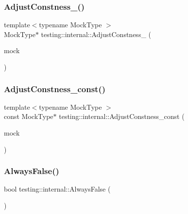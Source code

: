 \subsubsection{\texorpdfstring{AdjustConstness\_()}{AdjustConstness\_()}}
{\footnotesize\ttfamily template$<$typename Mock\+Type $>$ \\
Mock\+Type$\ast$ testing\+::internal\+::\+Adjust\+Constness\+\_\+ (\begin{DoxyParamCaption}\item[{const Mock\+Type $\ast$}]{mock }\end{DoxyParamCaption})}

\mbox{\label{namespacetesting_1_1internal_a018d17632278ac8fc2c9dcaaf629b62d}} 
\subsubsection{\texorpdfstring{AdjustConstness\_const()}{AdjustConstness\_const()}}
{\footnotesize\ttfamily template$<$typename Mock\+Type $>$ \\
const Mock\+Type$\ast$ testing\+::internal\+::\+Adjust\+Constness\+\_\+const (\begin{DoxyParamCaption}\item[{const Mock\+Type $\ast$}]{mock }\end{DoxyParamCaption})}

\mbox{\label{namespacetesting_1_1internal_a4b24c851ab13569b1b15b3d259b60d2e}} 
\subsubsection{\texorpdfstring{AlwaysFalse()}{AlwaysFalse()}}
{\footnotesize\ttfamily bool testing\+::internal\+::\+Always\+False (\begin{DoxyParamCaption}{ }\end{DoxyParamCaption})\hspace{0.3cm}{\ttfamily [inline]}}

\mbox{\label{namespacetesting_1_1internal_a922c9da63cd4bf94fc473b9ecac76414}} 
